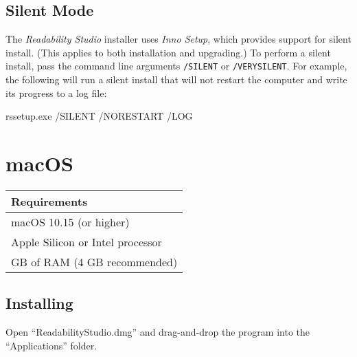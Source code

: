 \documentclass[
  letterpaper,
]{LegrandOrangeBook}
\newenvironment{Shaded}{\begin{snugshade}}{\end{snugshade}}
\newcommand{\ExtensionTok}[1]{\textcolor[rgb]{0.00,0.23,0.31}{#1}}
\newcommand{\NormalTok}[1]{\textcolor[rgb]{0.00,0.23,0.31}{#1}}
\begin{document}
\newpage{}

\section*{Silent Mode}\label{silent-mode}


The \emph{Readability Studio} installer uses \emph{Inno Setup}, which
provides support for silent install. (This applies to both installation
and upgrading.) To perform a silent install, pass the command line
arguments \texttt{/SILENT} or \texttt{/VERYSILENT}. For example, the
following will run a silent install that will not restart the computer
and write its progress to a log file:

\begin{Shaded}
\begin{Highlighting}[]
\ExtensionTok{rssetup.exe}\NormalTok{ /SILENT /NORESTART /LOG}
\end{Highlighting}
\end{Shaded}

\chapter{\texorpdfstring{macOS \faApple }{macOS }}\label{macos}

\begin{longtable}[]{@{}
  >{\raggedright\arraybackslash}p{}@{}}
\toprule\noalign{}
\begin{minipage}[b]{\linewidth}\raggedright
Requirements
\end{minipage} \\
\midrule\noalign{}
\endhead
\bottomrule\noalign{}
\endlastfoot
macOS 10.15 (or higher) \\
Apple Silicon or Intel processor \\
2 GB of RAM (4 GB recommended) \\
\end{longtable}

\section*{Installing}\label{installing-2}


Open ``ReadabilityStudio.dmg'' and drag-and-drop the program into the
``Applications'' folder.
\end{document}
